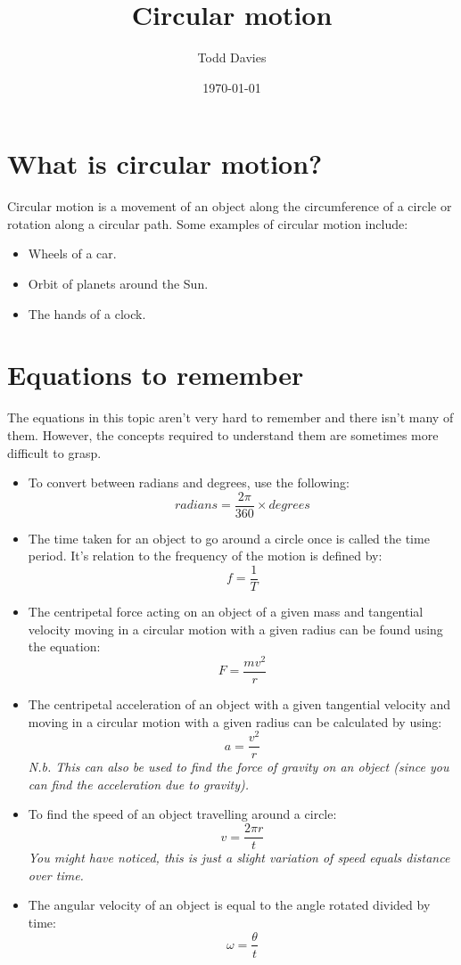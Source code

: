 \documentclass{article}
\title{Circular motion}
\author{Todd Davies}
\date{\today}
\begin{document}
\lhead{\today}

\maketitle

\section*{What is circular motion?}
\thispagestyle{empty}
Circular motion is a movement of an object along the circumference of a circle
or rotation along a circular path. Some examples of circular motion include:
\begin{itemize}
	\item Wheels of a car.
	\item Orbit of planets around the Sun.
	\item The hands of a clock.
\end{itemize}

\section*{Equations to remember}
\label{sec:Equations To Remember}
The equations in this topic aren't very hard to remember and there isn't many of
them. However, the concepts required to understand them are sometimes more
difficult to grasp.

\begin{itemize}
	\item To convert between radians and degrees, use the following:
	\[
		radians = \frac{2\pi}{360} \times degrees
	\]
	\item The time taken for an object to go around a circle once is called the
	time period. It's relation to the frequency of the motion is defined by:
	\[
		f = \frac{1}{T}
	\]
	\item The centripetal force acting on an object of a given mass and
	tangential velocity moving in a circular motion with a given radius can be
	found using the equation:
	\[
		F = \frac{mv^2}{r}
	\]
	\item The centripetal acceleration of an object with a given tangential
	velocity and moving in a circular motion with a given radius can be
	calculated by using:
	\[
		a = \frac{v^2}{r}
	\]
	\textit{N.b. This can also be used to find the force of gravity on an object
	(since you can find the acceleration due to gravity).}
	\item To find the speed of an object travelling around a circle:
	\[
		v = \frac{2 \pi r}{t}
	\]
	\textit{You might have noticed, this is just a slight variation of speed
	equals distance over time.}
	\item The angular velocity of an object is equal to the angle rotated
	divided by time:
	\[
		\omega = \frac{ \theta }{t}
	\]
\end{itemize}
\end{document}
